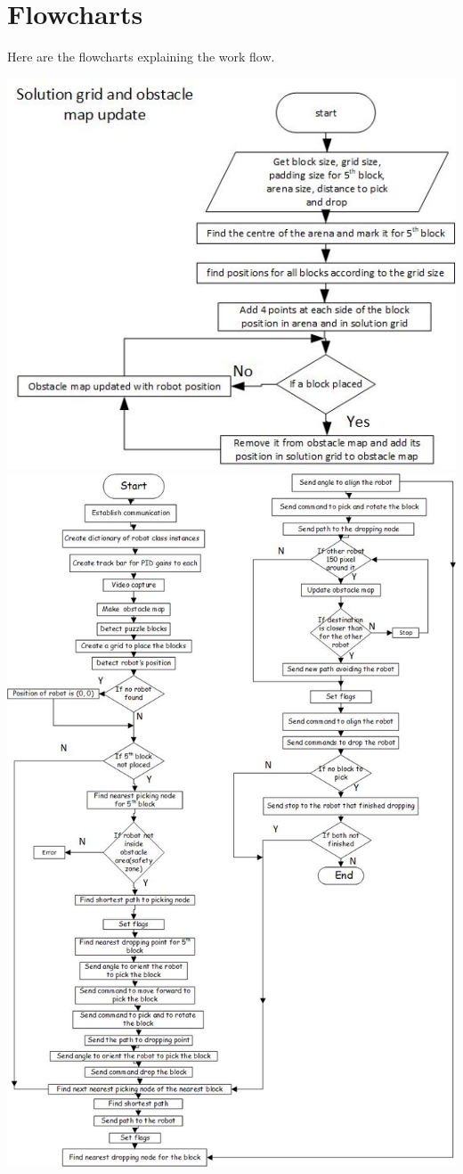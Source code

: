 \documentclass[a4paper,12pt,oneside]{book}
\begin{document}
\section{Flowcharts}
Here are the flowcharts explaining the work flow.
\begin{center}
\includegraphics[scale=0.55]{solutiongrid.jpg}\\
\includegraphics[scale=0.75]{flowchart.jpg}\\

\end{center}
\end{document}
